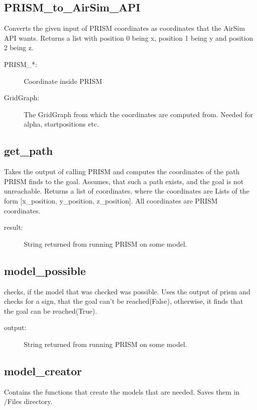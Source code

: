 \documentclass{article}
\begin{document}
\subsection{PRISM\_to\_AirSim\_API}
Converts the given input of PRISM coordinates as coordinates that the AirSim API wants. Returns a list with position 0 being x, position 1 being y and position 2 being z.

\begin{description}
    \item[PRISM\_*:] Coordinate inside PRISM
    \item[GridGraph:] The GridGraph from which the coordinates are computed from. Needed for alpha, startpositions etc.
\end{description}

\subsection{get\_path}
Takes the output of calling PRISM and computes the coordinates of the path PRISM finds to the goal. Assumes, that such a path exists, and the goal is not unreachable. Returns a list of coordinates, where the coordinates are Lists of the form [x\_position, y\_position, z\_position]. All coordinates are PRISM coordinates.

\begin{description}
    \item[result:] String returned from running PRISM on some model.
\end{description}

\subsection{model\_possible}
checks, if the model that was checked was possible. Uses the output of prism and checks for a sign, that the goal can't be reached(False), otherwise, it finds that the goal can be reached(True).

\begin{description}
    \item[output:] String returned from running PRISM on some model.
\end{description}

\subsection{model\_creator}
Contains the functions that create the models that are needed. Saves them in /Files directory. 
\end{document}
